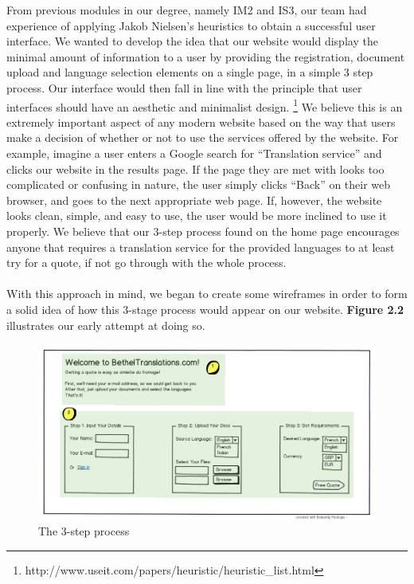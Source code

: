 \documentclass{l3proj}
\begin{document}
From previous modules in our degree, namely IM2 and IS3, our team had experience
of applying Jakob Nielsen's heuristics to obtain a successful user interface. We
wanted to develop the idea that our website would display the minimal amount of
information to a user by providing the registration, document upload and
language selection elements on a single page, in a simple 3 step process. Our
interface would then fall in line with the principle that user interfaces should
have an aesthetic and minimalist design.
\footnote{http://www.useit.com/papers/heuristic/heuristic\_list.html} We believe
this is an extremely important aspect of any modern website based on the way
that users make a decision of whether or not to use the services offered by the
website. For example, imagine a user enters a Google search for ``Translation
service'' and clicks our website in the results page. If the page they are met
with looks too complicated or confusing in nature, the user simply clicks
``Back'' on their web browser, and goes to the next appropriate web page. If,
however, the website looks clean, simple, and easy to use, the user would be
more inclined to use it properly. We believe that our 3-step process found on
the home page encourages anyone that requires a translation service for the
provided languages to at least try for a quote, if not go through with the whole
process.\\
\\
With this approach in mind, we began to create some wireframes in order to form
a solid idea of how this 3-stage process would appear on our website.
\textbf{Figure 2.2} illustrates our early attempt at doing so.

\begin{figure}
\begin{center}
\includegraphics[width=\linewidth]{wireframes/bt-3step}
\caption{The 3-step process}
\end{center}
\end{figure}
\end{document}
